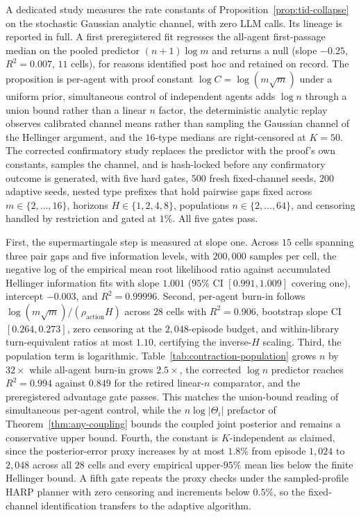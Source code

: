 A dedicated study measures the rate constants of Proposition~\ref{prop:tid-collapse} on the stochastic Gaussian analytic channel, with zero LLM calls. Its lineage is reported in full. A first preregistered fit regresses the all-agent first-passage median on the pooled predictor $(n{+}1)\log m$ and returns a null (slope $-0.25$, $R^2{=}0.007$, $11$ cells), for reasons identified post hoc and retained on record. The proposition is per-agent with proof constant $\log C=\log(m\sqrt m)$ under a uniform prior, simultaneous control of independent agents adds $\log n$ through a union bound rather than a linear $n$ factor, the deterministic analytic replay observes calibrated channel means rather than sampling the Gaussian channel of the Hellinger argument, and the $16$-type medians are right-censored at $K{=}50$. The corrected confirmatory study replaces the predictor with the proof's own constants, samples the channel, and is hash-locked before any confirmatory outcome is generated, with five hard gates, $500$ fresh fixed-channel seeds, $200$ adaptive seeds, nested type prefixes that hold pairwise gaps fixed across $m\in\{2,\dots,16\}$, horizons $H\in\{1,2,4,8\}$, populations $n\in\{2,\dots,64\}$, and censoring handled by restriction and gated at $1\%$. All five gates pass.

First, the supermartingale step is measured at slope one. Across $15$ cells spanning three pair gaps and five information levels, with $200{,}000$ samples per cell, the negative log of the empirical mean root likelihood ratio against accumulated Hellinger information fits with slope $1.001$ ($95\%$ CI $[0.991,1.009]$ covering one), intercept $-0.003$, and $R^2{=}0.99996$. Second, per-agent burn-in follows $\log(m\sqrt m)/(\rho_{\mathrm{action}}H)$ across $28$ cells with $R^2{=}0.906$, bootstrap slope CI $[0.264,0.273]$, zero censoring at the $2{,}048$-episode budget, and within-library turn-equivalent ratios at most $1.10$, certifying the inverse-$H$ scaling. Third, the population term is logarithmic. Table~\ref{tab:contraction-population} grows $n$ by $32\times$ while all-agent burn-in grows $2.5\times$, the corrected $\log n$ predictor reaches $R^2{=}0.994$ against $0.849$ for the retired linear-$n$ comparator, and the preregistered advantage gate passes. This matches the union-bound reading of simultaneous per-agent control, while the $n\log|\Theta_i|$ prefactor of Theorem~\ref{thm:any-coupling} bounds the coupled joint posterior and remains a conservative upper bound. Fourth, the constant is $K$-independent as claimed, since the posterior-error proxy increases by at most $1.8\%$ from episode $1{,}024$ to $2{,}048$ across all $28$ cells and every empirical upper-$95\%$ mean lies below the finite Hellinger bound. A fifth gate repeats the proxy checks under the sampled-profile HARP planner with zero censoring and increments below $0.5\%$, so the fixed-channel identification transfers to the adaptive algorithm.


